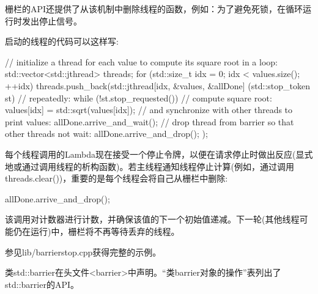 栅栏的API还提供了从该机制中删除线程的函数，例如：为了避免死锁，在循环运行时发出停止信号。

启动的线程的代码可以这样写:

\begin{cpp}
// initialize a thread for each value to compute its square root in a loop:
std::vector<std::jthread> threads;
for (std::size_t idx = 0; idx < values.size(); ++idx) {
	threads.push_back(std::jthread{[idx, &values, &allDone] (std::stop_token st) {
									// repeatedly:
									while (!st.stop_requested()) {
										// compute square root:
										values[idx] = std::sqrt(values[idx]);
										// and synchronize with other threads to print values:
										allDone.arrive_and_wait();
									}
									// drop thread from barrier so that other threads not wait:
									allDone.arrive_and_drop();
							}});
}
\end{cpp}

每个线程调用的Lambda现在接受一个停止令牌，以便在请求停止时做出反应(显式地或通过调用线程的析构函数)。若主线程通知线程停止计算(例如，通过调用threads.clear())，重要的是每个线程会将自己从栅栏中删除:

\begin{cpp}
allDone.arrive_and_drop();
\end{cpp}

该调用对计数器进行计数，并确保该值的下一个初始值递减。下一轮(其他线程可能仍在运行)中，栅栏将不再等待丢弃的线程。

参见lib/barrierstop.cpp获得完整的示例。


类std::barrier在头文件<barrier>中声明。“类barrier对象的操作”表列出了std::barrier的API。

